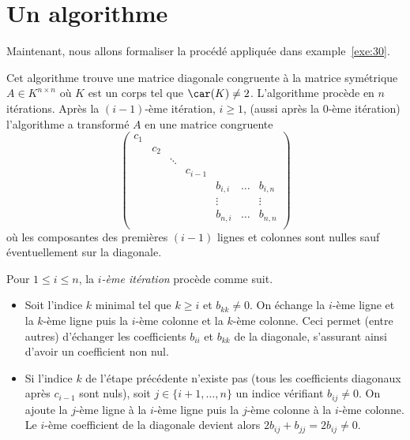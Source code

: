 \section{Un algorithme }
\label{sec:un-algorithme}

Maintenant, nous allons formaliser la procédé appliquée dans example~\ref{exe:30}. 
\begin{algorithm}
  \label{alg:1}
  Cet algorithme trouve une matrice diagonale congruente à la matrice symétrique $A \in K^{n \times n}$ où $K$ est un corps tel que $\car(K) \neq 2$.  L'algorithme procède en $n$ itérations. Après la $(i-1)$-ème itération, $i \geq 1$, (aussi après  la $0$-ème itération) l'algorithme a transformé $A$ en une matrice congruente 
  \begin{equation}
    \label{eq:7}
    \begin{pmatrix}
      c_1 \\
      & c_2 \\
      & & \ddots & &&\\
      & & & c_{i-1} \\
      & & & &  b_{i,i} & \dots & b_{i,n} \\
      & & & &     \vdots       &  & \vdots \\
      & & & &  b_{n,i} & \dots & b_{n,n} \\      
    \end{pmatrix}
  \end{equation}
où les composantes des premières $(i-1)$ lignes et colonnes sont nulles sauf éventuellement sur la diagonale. 

\medskip 
\noindent 
Pour $1 \leq i \leq n$, la \emph{$i$-ème itération} procède comme suit. 
\begin{itemize}
 \item Soit l'indice $k$ minimal tel que $k \geq i$ et $b_{kk} \neq 0$. On échange la $i$-ème ligne et la $k$-ème ligne puis la $i$-ème colonne et la $k$-ème colonne. Ceci permet (entre autres) d'échanger les coefficients $b_{ii}$ et $b_{kk}$ de la diagonale, s'assurant ainsi d'avoir un coefficient non nul. 
 
 \item Si l'indice $k$ de l'étape précédente n'existe pas (tous les coefficients diagonaux après $c_{i-1}$ sont nuls), soit $j \in \{i+1,\dots,n\}$ un indice vérifiant $b_{ij} \neq 0$. On ajoute la $j$-ème ligne à la $i$-ème ligne puis la $j$-ème colonne à la $i$-ème colonne. Le $i$-ème coefficient de la diagonale devient alors $2 b_{ij} + b_{jj} = 2 b_{ij} \neq 0$.
 

\end{itemize}
\end{algorithm}
